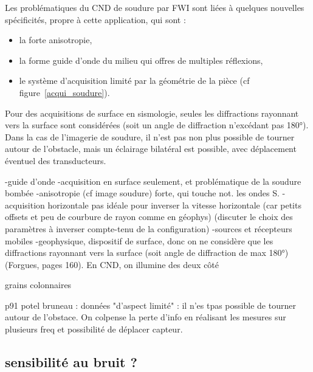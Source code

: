 Les problématiques du CND de soudure par FWI sont liées à quelques nouvelles spécificités, propre à cette application, qui sont : 
\begin{itemize}
	\item la forte anisotropie,
	\item la forme guide d'onde du milieu qui offres de multiples réflexions,
	\item le système d'acquisition limité par la géométrie de la pièce (cf figure~\ref{acqui_soudure}).
\end{itemize}



Pour des acquisitions de surface en sismologie, seules les diffractions rayonnant vers la surface sont considérées (soit un angle de diffraction n'excédant pas 180°). Dans la cas de l'imagerie de soudure, il n'est pas non plus possible de tourner autour de l'obstacle, mais un éclairage bilatéral est possible, avec déplacement éventuel des transducteurs.



-guide d'onde
-acquisition en surface seulement, et problématique de la soudure bombée
-anisotropie (cf image soudure) forte, qui touche not. les ondes S.
-acquisition horizontale pas idéale pour inverser la vitesse horizontale (car petits offsets et peu de courbure de rayon comme en géophys) (discuter le choix des paramètres à inverser compte-tenu de la configuration)
-sources et récepteurs mobiles 
-geophysique, dispositif de surface, donc on ne considère que les diffractions rayonnant vers la surface (soit angle de diffraction de max 180°)(Forgues, pages 160). En CND, on illumine des deux côté



grains colonnaires

p91 potel bruneau : données "d'aspect limité" : il n'es tpas possible de tourner autour de l'obstace. On colpense la perte d'info en réalisant les mesures sur plusieurs freq et possibilité de déplacer capteur.




\subsection{sensibilité au bruit ?}



